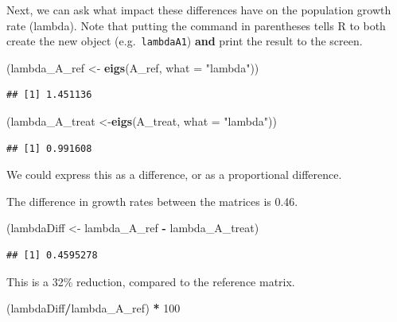 \documentclass[
  a4paper]{book}
\newenvironment{Shaded}{\begin{snugshade}}{\end{snugshade}}
\newcommand{\AttributeTok}[1]{\textcolor[rgb]{0.13,0.29,0.53}{#1}}
\newcommand{\DecValTok}[1]{\textcolor[rgb]{0.00,0.00,0.81}{#1}}
\newcommand{\FunctionTok}[1]{\textcolor[rgb]{0.13,0.29,0.53}{\textbf{#1}}}
\newcommand{\NormalTok}[1]{#1}
\newcommand{\OtherTok}[1]{\textcolor[rgb]{0.56,0.35,0.01}{#1}}
\newcommand{\SpecialCharTok}[1]{\textcolor[rgb]{0.81,0.36,0.00}{\textbf{#1}}}
\newcommand{\StringTok}[1]{\textcolor[rgb]{0.31,0.60,0.02}{#1}}
\begin{document}
Next, we can ask what impact these differences have on the population growth rate (lambda).
Note that putting the command in parentheses tells R to both create the new object (e.g.~\texttt{lambdaA1}) \textbf{and} print the result to the screen.

\begin{Shaded}
\begin{Highlighting}[]
\NormalTok{(lambda\_A\_ref }\OtherTok{\textless{}{-}} \FunctionTok{eigs}\NormalTok{(A\_ref, }\AttributeTok{what =} \StringTok{"lambda"}\NormalTok{))}
\end{Highlighting}
\end{Shaded}

\begin{verbatim}
## [1] 1.451136
\end{verbatim}

\begin{Shaded}
\begin{Highlighting}[]
\NormalTok{(lambda\_A\_treat }\OtherTok{\textless{}{-}}\FunctionTok{eigs}\NormalTok{(A\_treat, }\AttributeTok{what =} \StringTok{"lambda"}\NormalTok{))}
\end{Highlighting}
\end{Shaded}

\begin{verbatim}
## [1] 0.991608
\end{verbatim}

We could express this as a difference, or as a proportional difference.

The difference in growth rates between the matrices is 0.46.

\begin{Shaded}
\begin{Highlighting}[]
\NormalTok{(lambdaDiff }\OtherTok{\textless{}{-}}\NormalTok{ lambda\_A\_ref }\SpecialCharTok{{-}}\NormalTok{ lambda\_A\_treat)}
\end{Highlighting}
\end{Shaded}

\begin{verbatim}
## [1] 0.4595278
\end{verbatim}

This is a 32\% reduction, compared to the reference matrix.

\begin{Shaded}
\begin{Highlighting}[]
\NormalTok{(lambdaDiff}\SpecialCharTok{/}\NormalTok{lambda\_A\_ref) }\SpecialCharTok{*} \DecValTok{100}
\end{Highlighting}
\end{Shaded}
\end{document}

